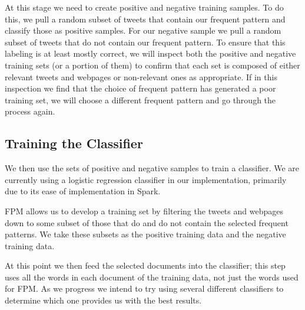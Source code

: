 At this stage we need to create positive and negative training samples. To do this, we pull a random subset of tweets that contain our frequent pattern and classify those as positive samples. For our negative sample we pull a random subset of tweets that do not contain our frequent pattern. To ensure that this labeling is at least mostly correct, we will inspect both the positive and negative training sets (or a portion of them) to confirm that each set is composed of either relevant tweets and webpages or non-relevant ones as appropriate. If in this inspection we find that the choice of frequent pattern has generated a poor training set, we will choose a different frequent pattern and go through the process again.



\subsection{Training the Classifier}

We then use the sets of positive and negative samples to train a classifier. We are currently using a logistic regression classifier in our implementation, primarily due to its ease of implementation in Spark.

FPM allows us to develop a training set by filtering the tweets and webpages down to some subset of those that do and do not contain the selected frequent patterns. We take these subsets as the positive training data and the negative training data.

At this point we then feed the selected documents into the classifier; this step uses all the words in each document of the training data, not just the words used for FPM. As we progress we intend to try using several different classifiers to determine which one provides us with the best results.


